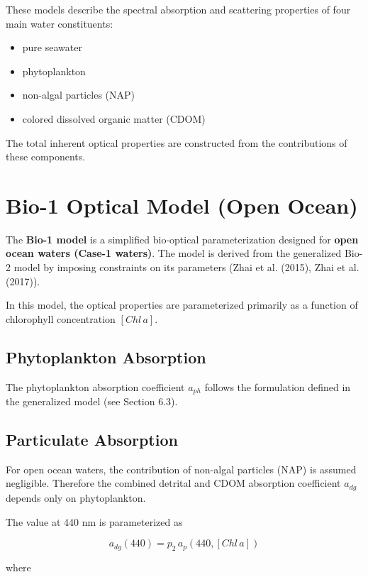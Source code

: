 \documentclass[
  letterpaper,
]{scrbook}
\providecommand{\tightlist}{%
  \setlength{\itemsep}{0pt}\setlength{\parskip}{0pt}}
\begin{document}
These models describe the spectral absorption and scattering properties
of four main water constituents:

\begin{itemize}
\tightlist
\item
  pure seawater
\item
  phytoplankton
\item
  non-algal particles (NAP)
\item
  colored dissolved organic matter (CDOM)
\end{itemize}

The total inherent optical properties are constructed from the
contributions of these components.

\section{Bio-1 Optical Model (Open
Ocean)}\label{bio-1-optical-model-open-ocean}

The \textbf{Bio-1 model} is a simplified bio-optical parameterization
designed for \textbf{open ocean waters (Case-1 waters)}. The model is
derived from the generalized Bio-2 model by imposing constraints on its
parameters (Zhai et al. (2015), Zhai et al. (2017)).

In this model, the optical properties are parameterized primarily as a
function of chlorophyll concentration \([Chl\,a]\).

\subsection{Phytoplankton Absorption}\label{phytoplankton-absorption}

The phytoplankton absorption coefficient \(a_{ph}\) follows the
formulation defined in the generalized model (see Section 6.3).

\subsection{Particulate Absorption}\label{particulate-absorption}

For open ocean waters, the contribution of non-algal particles (NAP) is
assumed negligible. Therefore the combined detrital and CDOM absorption
coefficient \(a_{dg}\) depends only on phytoplankton.

The value at 440 nm is parameterized as

\[
a_{dg}(440) = p_2\, a_p(440,[Chl\,a])
\]

where
\end{document}
